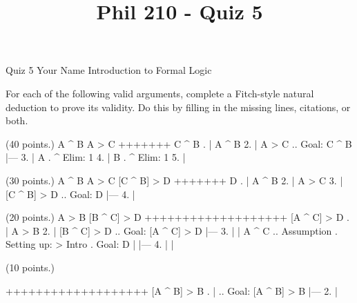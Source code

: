 
\title{Phil 210 - Quiz 5}

\heading
Quiz 5
Your Name
Introduction to Formal Logic
\endheading

For each of the following valid arguments, complete a Fitch-style natural deduction to prove its validity. Do this by filling in the missing lines, citations, or both.

\problems
{} (40 points.)
\argument
 A ^ B
 A > C
+++++++
 C ^ B
\endargument
        \answer
        . | A ^ B
         2. | A > C  ..  Goal: C ^ B
            |---
         3. | A      .  ^ Elim: 1
         4. | B      .  ^ Elim: 1
         5. | 
        \endfitchproof
        \endanswer

 (30 points.)
\argument
 A ^ B
 A > C
 [C ^ B] > D
+++++++
 D
\endargument
        \answer
        . | A ^ B
         2. | A > C
         3. | [C ^ B] > D  ..  Goal: D
            |---
         4. | 
        \endfitchproof
        \endanswer

 (20 points.)
\argument
 A > B
 [B ^ C] > D
+++++++++++++++++++
 [A ^ C] > D
\endargument
        \answer
        . | A > B
         2. | [B ^ C] > D  ..  Goal: [A ^ C] > D
            |---
         3. |   | A ^ C    ..  Assumption  .  Setting up: > Intro  .  Goal: D
            |   |---
         4. |   | 
        \endfitchproof
        \endanswer

 (10 points.)
\argument

+++++++++++++++++++
 [A ^ B] > B
\endargument
        \answer
        . |              ..  Goal: [A ^ B] > B
            |---
         2. | 
        \endfitchproof
        \endanswer

\endproblems
\bye
